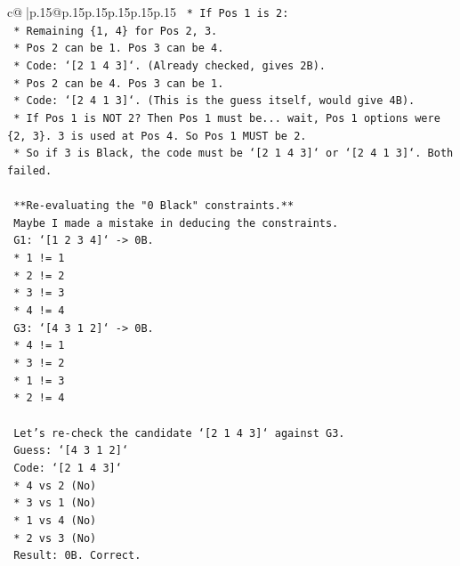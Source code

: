 \documentclass{article}
\begin{document}
{\begin{supertabular}{c@{$\;$}|p{.15\linewidth}@{}p{.15\linewidth}p{.15\linewidth}p{.15\linewidth}p{.15\linewidth}p{.15\linewidth}}
{{{\texttt{        *   If Pos 1 is 2:} \\
\texttt{            *   Remaining \{1, 4\} for Pos 2, 3.} \\
\texttt{            *   Pos 2 can be 1. Pos 3 can be 4.} \\
\texttt{            *   Code: `{[}2 1 4 3{]}`. (Already checked, gives 2B).} \\
\texttt{            *   Pos 2 can be 4. Pos 3 can be 1.} \\
\texttt{            *   Code: `{[}2 4 1 3{]}`. (This is the guess itself, would give 4B).} \\
\texttt{        *   If Pos 1 is NOT 2? Then Pos 1 must be... wait, Pos 1 options were \{2, 3\}. 3 is used at Pos 4. So Pos 1 MUST be 2.} \\
\texttt{        *   So if 3 is Black, the code must be `{[}2 1 4 3{]}` or `{[}2 4 1 3{]}`. Both failed.} \\
\\ 
\texttt{    **Re{-}evaluating the "0 Black" constraints.**} \\
\texttt{    Maybe I made a mistake in deducing the constraints.} \\
\texttt{    G1: `{[}1 2 3 4{]}` {-}> 0B.} \\
\texttt{    *   1 != 1} \\
\texttt{    *   2 != 2} \\
\texttt{    *   3 != 3} \\
\texttt{    *   4 != 4} \\
\texttt{    G3: `{[}4 3 1 2{]}` {-}> 0B.} \\
\texttt{    *   4 != 1} \\
\texttt{    *   3 != 2} \\
\texttt{    *   1 != 3} \\
\texttt{    *   2 != 4} \\
\\ 
\texttt{    Let's re{-}check the candidate `{[}2 1 4 3{]}` against G3.} \\
\texttt{    Guess: `{[}4 3 1 2{]}`} \\
\texttt{    Code: `{[}2 1 4 3{]}`} \\
\texttt{    *   4 vs 2 (No)} \\
\texttt{    *   3 vs 1 (No)} \\
\texttt{    *   1 vs 4 (No)} \\
\texttt{    *   2 vs 3 (No)} \\
\texttt{    Result: 0B. Correct.} \\
}}}
\end{supertabular}}
\end{document}
